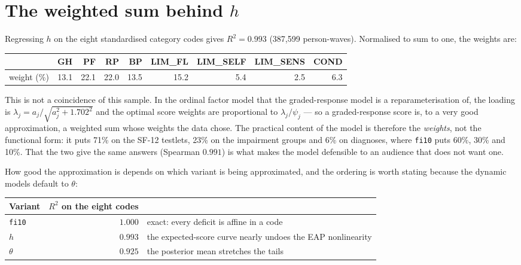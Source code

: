 \documentclass[11pt]{article}
\newcommand{\code}[1]{\texttt{\small #1}}
\begin{document}
\appendix

\section{The weighted sum behind $h$}
\label{sec:weights}

Regressing $h$ on the eight standardised category codes gives $R^2 = 0.993$
(387,599 person-waves). Normalised to sum to one, the weights are:

\begin{center}\small
\begin{tabular}{lrrrrrrrr}
\toprule
& GH & PF & RP & BP & LIM\_FL & LIM\_SELF & LIM\_SENS & COND \\
\midrule
weight (\%) & 13.1 & 22.1 & 22.0 & 13.5 & 15.2 & 5.4 & 2.5 & 6.3 \\
\bottomrule
\end{tabular}
\end{center}

This is not a coincidence of this sample. In the ordinal factor model that the
graded-response model is a reparameterisation of, the loading is
$\lambda_j = a_j/\sqrt{a_j^2 + 1.702^2}$ and the optimal score weights are
proportional to $\lambda_j/\psi_j$ --- so a graded-response score is, to a very
good approximation, a weighted sum whose weights the data chose. The practical
content of the model is therefore the \emph{weights}, not the functional form:
it puts 71\% on the SF-12 testlets, 23\% on the impairment groups and 6\% on
diagnoses, where \code{fi10} puts 60\%, 30\% and 10\%. That the two give the same answers (Spearman $0.991$) is what
makes the model defensible to an audience that does not want one.

How good the approximation is depends on which variant is being approximated, and
the ordering is worth stating because the dynamic models default to $\theta$:

\begin{center}\small
\begin{tabular}{lrl}
\toprule
Variant & $R^2$ on the eight codes & \\
\midrule
\code{fi10} & $1.000$ & exact: every deficit is affine in a code \\
$h$ & $0.993$ & the expected-score curve nearly undoes the {EAP} nonlinearity \\
$\theta$ & $0.925$ & the posterior mean stretches the tails \\
\bottomrule
\end{tabular}
\end{center}
\end{document}
